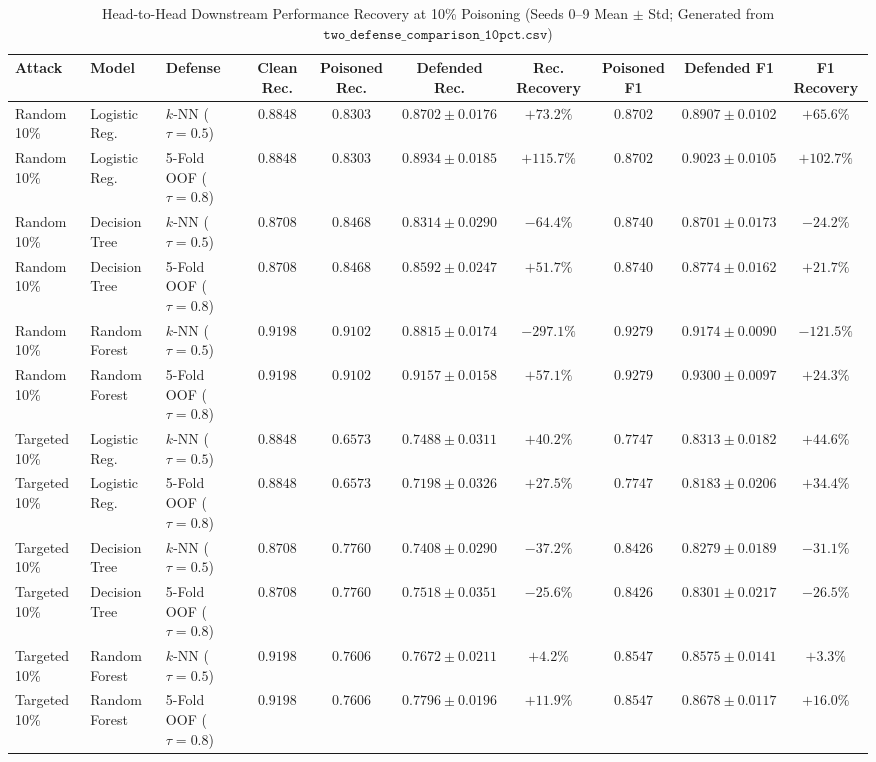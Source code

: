 \documentclass[10pt,conference]{IEEEtran}
\begin{document}
\begin{table}[htbp]
\caption{Head-to-Head Downstream Performance Recovery at 10\% Poisoning (Seeds 0--9 Mean $\pm$ Std; Generated from $\mathtt{two\_defense\_comparison\_10pct.csv}$)}
\label{tab:two_defense_rec}
\centering
\begin{tabular}{lllccccccc}
\toprule
\textbf{Attack} & \textbf{Model} & \textbf{Defense} & \textbf{Clean Rec.} & \textbf{Poisoned Rec.} & \textbf{Defended Rec.} & \textbf{Rec. Recovery} & \textbf{Poisoned F1} & \textbf{Defended F1} & \textbf{F1 Recovery} \\
\midrule
Random 10\% & Logistic Reg. & $k$-NN ($\tau=0.5$) & $0.8848$ & $0.8303$ & $0.8702 \pm 0.0176$ & $+73.2\%$ & $0.8702$ & $0.8907 \pm 0.0102$ & $+65.6\%$ \\
Random 10\% & Logistic Reg. & 5-Fold OOF ($\tau=0.8$) & $0.8848$ & $0.8303$ & $\mathbf{0.8934 \pm 0.0185}$ & $\mathbf{+115.7\%}$ & $0.8702$ & $\mathbf{0.9023 \pm 0.0105}$ & $\mathbf{+102.7\%}$ \\
Random 10\% & Decision Tree & $k$-NN ($\tau=0.5$) & $0.8708$ & $0.8468$ & $0.8314 \pm 0.0290$ & $-64.4\%$ & $0.8740$ & $0.8701 \pm 0.0173$ & $-24.2\%$ \\
Random 10\% & Decision Tree & 5-Fold OOF ($\tau=0.8$) & $0.8708$ & $0.8468$ & $\mathbf{0.8592 \pm 0.0247}$ & $\mathbf{+51.7\%}$ & $0.8740$ & $\mathbf{0.8774 \pm 0.0162}$ & $\mathbf{+21.7\%}$ \\
Random 10\% & Random Forest & $k$-NN ($\tau=0.5$) & $0.9198$ & $0.9102$ & $0.8815 \pm 0.0174$ & $-297.1\%$ & $0.9279$ & $0.9174 \pm 0.0090$ & $-121.5\%$ \\
Random 10\% & Random Forest & 5-Fold OOF ($\tau=0.8$) & $0.9198$ & $0.9102$ & $\mathbf{0.9157 \pm 0.0158}$ & $\mathbf{+57.1\%}$ & $0.9279$ & $\mathbf{0.9300 \pm 0.0097}$ & $\mathbf{+24.3\%}$ \\
\midrule
Targeted 10\% & Logistic Reg. & $k$-NN ($\tau=0.5$) & $0.8848$ & $0.6573$ & $\mathbf{0.7488 \pm 0.0311}$ & $\mathbf{+40.2\%}$ & $0.7747$ & $\mathbf{0.8313 \pm 0.0182}$ & $\mathbf{+44.6\%}$ \\
Targeted 10\% & Logistic Reg. & 5-Fold OOF ($\tau=0.8$) & $0.8848$ & $0.6573$ & $0.7198 \pm 0.0326$ & $+27.5\%$ & $0.7747$ & $0.8183 \pm 0.0206$ & $+34.4\%$ \\
Targeted 10\% & Decision Tree & $k$-NN ($\tau=0.5$) & $0.8708$ & $0.7760$ & $0.7408 \pm 0.0290$ & $-37.2\%$ & $0.8426$ & $0.8279 \pm 0.0189$ & $-31.1\%$ \\
Targeted 10\% & Decision Tree & 5-Fold OOF ($\tau=0.8$) & $0.8708$ & $0.7760$ & $0.7518 \pm 0.0351$ & $-25.6\%$ & $0.8426$ & $0.8301 \pm 0.0217$ & $-26.5\%$ \\
Targeted 10\% & Random Forest & $k$-NN ($\tau=0.5$) & $0.9198$ & $0.7606$ & $0.7672 \pm 0.0211$ & $+4.2\%$ & $0.8547$ & $0.8575 \pm 0.0141$ & $+3.3\%$ \\
Targeted 10\% & Random Forest & 5-Fold OOF ($\tau=0.8$) & $0.9198$ & $0.7606$ & $\mathbf{0.7796 \pm 0.0196}$ & $\mathbf{+11.9\%}$ & $0.8547$ & $\mathbf{0.8678 \pm 0.0117}$ & $\mathbf{+16.0\%}$ \\
\bottomrule
\end{tabular}
\end{table}
\end{document}
